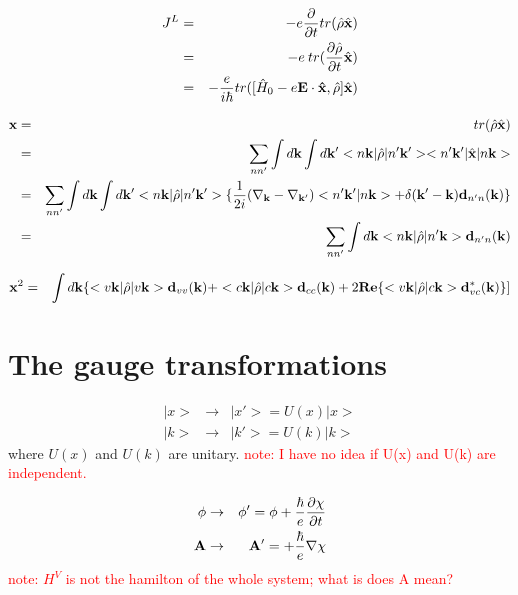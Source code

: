 \documentclass[aps,prb,preprint]{revtex4-1}
\begin{document}
\begin{appendix}
\begin{eqnarray}
J^L &=&  -e\frac{\partial}{\partial t} tr(\hat{\rho}\hat{\bf x}) \nonumber \\
&=&  -e\: tr(\frac{\partial \hat{\rho} }{\partial t}\hat{\bf x}) \nonumber \\
&=&  -\frac{e}{i \hbar} tr([\hat{H}_0 -e{\bf E \cdot \hat{x}}, \hat{\rho}] \hat{\bf x}) \nonumber \\
\end{eqnarray} 

\begin{eqnarray}
{\bf x} &=&  tr(\hat{\rho}\hat{\bf x}) \nonumber \\
&=&  \sum_{nn'} \int d{\bf k} \int d{\bf k'} <n{\bf k}|\hat{\rho}|n'{\bf k'}><n'{\bf k'}|\hat{\bf x}|n{\bf k}> \nonumber \\
&=&  \sum_{nn'} \int d{\bf k} \int d{\bf k'} <n{\bf k}|\hat{\rho}|n'{\bf k'}>\{ \frac{1}{2i}(\nabla_{\bf k}-\nabla_{\bf k'}) <n'{\bf k'}|n{\bf k}> + \delta({\bf k'-k}) {\bf d}_{n'n}({\bf k})\} \nonumber \\
&=& \sum_{nn'} \int d{\bf k} <n{\bf k}|\hat{\rho}|n'{\bf k}> {\bf d}_{n'n}({\bf k})
\end{eqnarray} 

\begin{eqnarray}
{\bf x}^2 &=& \int d{\bf k} \{<v{\bf k}|\hat{\rho}|v{\bf k}> {\bf d}_{vv}({\bf k}) + <c{\bf k}|\hat{\rho}|c{\bf k}> {\bf d}_{cc}({\bf k}) + 2{\bf Re} \{ <v{\bf k}|\hat{\rho}|c{\bf k}> {\bf d}_{vc}^*({\bf k}) \}]
\end{eqnarray} 


\section{The gauge transformations}
\begin{eqnarray}
|x> &\rightarrow& |x'> = U(x) |x> \\
|k> &\rightarrow& |k'> = U(k) |k>
\end{eqnarray} 
where $U(x)$ and $U(k)$ are unitary.
\textcolor{red}{note: I have no idea if U(x) and U(k) are independent. }

\begin{eqnarray}
\phi &\rightarrow& \phi' = \phi +\frac{\hbar}{e} \frac{\partial \chi}{\partial t} \\
{\bf A} &\rightarrow& {\bf A}' = +\frac{\hbar}{e} {\bf \nabla} \chi
\end{eqnarray} 
\textcolor{red}{note: $H^V$ is not the hamilton of the whole system; what is does A mean?}


\end{appendix}
\end{document}
